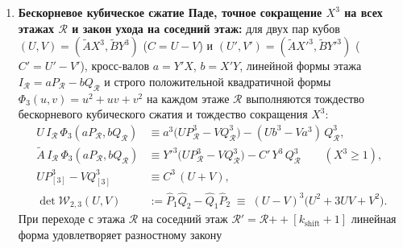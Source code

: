 \begin{theorem}
\begin{enumerate}[label=\textbf{(\arabic*)},leftmargin=*]
\begin{align}
    Q_{\mathcal{R}_1\mathbin{+\!+}\mathcal{R}_2}(U, V) &= Q_{\mathcal{R}_2}\bigl(P_{\mathcal{R}_1}(U, V),\; Q_{\mathcal{R}_1}(U, V)\bigr), \label{eq:math-pade-monoid-q}
  \end{align}
  а сумма и разность числителя и знаменателя на любом этаже $\mathcal{R}$ факторизуются через мультипликативные инварианты $\Pi_+(\mathcal{R}) = \prod_{r\in\mathcal{R}} r$ и $\Pi_-(\mathcal{R}) = \prod_{r\in\mathcal{R}} (2 - r)$:
  \begin{align}
    P_{\mathcal{R}}(U, V) + Q_{\mathcal{R}}(U, V) &\equiv \Pi_+(\mathcal{R})\,(U + V), \label{eq:math-pade-sum-factor} \\
    P_{\mathcal{R}}(U, V) - Q_{\mathcal{R}}(U, V) &\equiv \Pi_-(\mathcal{R})\,(U - V) \;=\; \Pi_-(\mathcal{R})\,C. \label{eq:math-pade-diff-factor}
  \end{align}
\item \textbf{Бескорневое кубическое сжатие Паде, точное сокращение $X^3$ на всех этажах $\mathcal{R}$ и закон ухода на соседний этаж:}
  для двух пар кубов $(U, V) = (\widetilde{A}X^3, \widetilde{B}Y^3)$ ($C = U - V$) и $(U', V') = (\widetilde{A}X'^3, \widetilde{B}Y'^3)$ ($C' = U' - V'$), кросс-валов $a = Y'X$, $b = X'Y$, линейной формы этажа $I_{\mathcal{R}} = a P_{\mathcal{R}} - b Q_{\mathcal{R}}$ и строго положительной квадратичной формы $\Phi_3(u, v) = u^2 + u v + v^2$ на каждом этаже $\mathcal{R}$ выполняются тождество бескорневого кубического сжатия и тождество сокращения $X^3$:
  \begin{align}
    U\,I_{\mathcal{R}}\,\Phi_3(a P_{\mathcal{R}}, b Q_{\mathcal{R}}) &\equiv a^3\bigl(U P_{\mathcal{R}}^3 - V Q_{\mathcal{R}}^3\bigr) - (U b^3 - V a^3)\,Q_{\mathcal{R}}^3, \label{eq:math-arbitrary-floor-cubic-pade} \\
    \widetilde{A}\,I_{\mathcal{R}}\,\Phi_3(a P_{\mathcal{R}}, b Q_{\mathcal{R}}) &\equiv Y'^3\bigl(U P_{\mathcal{R}}^3 - V Q_{\mathcal{R}}^3\bigr) - C'\,Y^3\,Q_{\mathcal{R}}^3 \qquad (X^3 \ge 1), \label{eq:math-arbitrary-floor-x3-cancel} \\
    U P_{[3]}^3 - V Q_{[3]}^3 &\equiv C^3\,(U + V), \label{eq:math-base-floor3-collapse} \\
    \det\mathcal{W}_{2,3}(U, V) &:= \widehat{P}_1\widehat{Q}_2 - \widehat{Q}_1\widehat{P}_2 \;\equiv\; (U - V)^3\bigl(U^2 + 3UV + V^2\bigr). \label{eq:math-cross-floor-wronskian23}
  \end{align}
  При переходе с этажа $\mathcal{R}$ на соседний этаж $\mathcal{R}' = \mathcal{R} \mathbin{+\!+} [k_{\mathrm{shift}} + 1]$ линейная форма удовлетворяет разностному закону

\end{enumerate}
\end{theorem}
